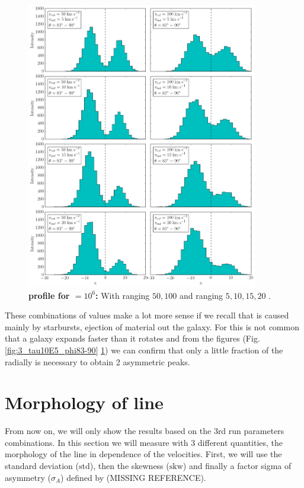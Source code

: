 \begin{figure}[h!]
	\begin{center}
		\includegraphics[width=0.9\textwidth]{./figures/chapter3/3_tau10E6_phi83-90}
	\end{center}
	\caption{\textbf{\lya profile for \tauh$=10^6$:} With \vrot ranging $50,100$ \kms and \vout ranging $5,10,15,20$ \kms.
		\label{fig:3_tau10E6_phi83-90}}
\end{figure}

These combinations of values make a lot more sense if we recall that \vout is caused mainly by starbursts, ejection of material out the galaxy. For this is not common that a galaxy expands faster than it rotates and from the figures (Fig. \ref{fig:3_tau10E5_phi83-90} \ref{fig:3_tau10E6_phi83-90}) we can confirm that only a little fraction of the \vrot radially is necessary to obtain 2 asymmetric peaks. \\

\section{Morphology of \lya line}
From now on, we will only show the results based on the 3rd run parameters combinations. In this section we will measure with 3 different quantities, the morphology of the \lya line in dependence of the velocities. First, we will use the standard deviation ($\mathrm{std}$), then the skewness ($\mathrm{skw}$) and finally a factor sigma of asymmetry ($\sigma_A$) defined by (MISSING REFERENCE).\\

